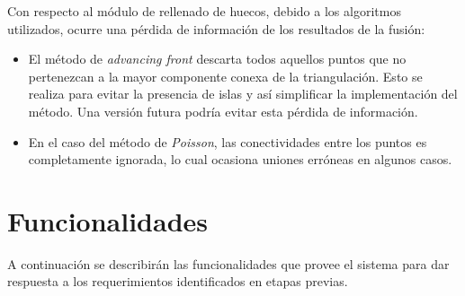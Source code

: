 		Con respecto al módulo de rellenado de huecos, debido a los algoritmos
		utilizados, ocurre una pérdida de información de los resultados de la
		fusión:
		\begin{itemize}
			\item El método de \emph{advancing front} descarta todos aquellos
				puntos que no pertenezcan a la mayor componente conexa de la
				triangulación. Esto se realiza para evitar la presencia de islas y así
				simplificar la implementación del método.
				Una versión futura podría evitar esta pérdida de información.

			\item En el caso del método de \emph{Poisson}, las conectividades entre los
				puntos es completamente ignorada, lo cual ocasiona uniones erróneas en algunos casos.
		\end{itemize}


	\section{Funcionalidades}
		A continuación se describirán las funcionalidades que provee el sistema
		para dar respuesta a los requerimientos identificados en etapas
		previas.

